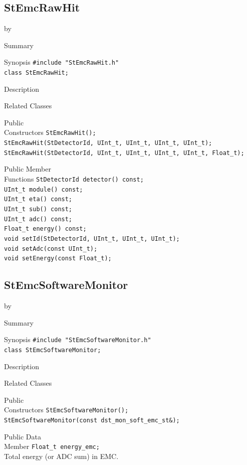 \documentclass[twoside]{article}
\newcommand{\entrylabel}[1]{\mbox{\textbf{{#1}}}\hfil}%
\newenvironment{entry}
{\begin{list}{}%
    {\renewcommand{\makelabel}{\entrylabel}%
     \setlength{\labelwidth}{90pt}%
     \setlength{\leftmargin}{\labelwidth}
     \advance\leftmargin by \labelsep%
      }%
    }%
  {\end{list}}
\newcommand{\Entrylabel}[1]%
{\raisebox{0pt}[1ex][0pt]{\makebox[\labelwidth][l]%
    {\parbox[t]{\labelwidth}{\hspace{0pt}\textbf{{#1}}}}}}
\newenvironment{Entry}%
{\renewcommand{\entrylabel}{\Entrylabel}\begin{entry}}%
  {\end{entry}}
\begin{document}
\subsection{StEmcRawHit}
\label{sec:StEmcRawHit}
\begin{Entry}
\item[Summary]
\item[Synopsis]
    \verb+#include "StEmcRawHit.h"+\\
    \verb+class StEmcRawHit;+\\
\item[Description]
\item[Related Classes]
\item[Public\\ Constructors]
    \verb+StEmcRawHit();+\\
    \verb+StEmcRawHit(StDetectorId, UInt_t, UInt_t, UInt_t, UInt_t);+\\
    \verb+StEmcRawHit(StDetectorId, UInt_t, UInt_t, UInt_t, UInt_t, Float_t);+\\
\item[Public Member\\ Functions]
    \verb+StDetectorId detector() const;+\\
    \verb+UInt_t module() const;+\\
    \verb+UInt_t eta() const;+\\
    \verb+UInt_t sub() const;+\\
    \verb+UInt_t adc() const;+\\
    \verb+Float_t energy() const;+\\
    \verb+void setId(StDetectorId, UInt_t, UInt_t, UInt_t);+\\
    \verb+void setAdc(const UInt_t);+\\
    \verb+void setEnergy(const Float_t);+\\
\end{Entry}
\clearpage


\subsection{StEmcSoftwareMonitor}
\label{sec:StEmcSoftwareMonitor}
\begin{Entry}
\item[Summary]
\item[Synopsis]
    \verb+#include "StEmcSoftwareMonitor.h"+\\
    \verb+class StEmcSoftwareMonitor;+\\
\item[Description]
\item[Related Classes]
\item[Public\\ Constructors]
    \verb+StEmcSoftwareMonitor();+\\
    \verb+StEmcSoftwareMonitor(const dst_mon_soft_emc_st&);+\\
\item[Public Data\\ Member]
    \verb+Float_t energy_emc;+\\
    Total energy (or ADC sum) in EMC.
\end{Entry}
\clearpage
\end{document}
